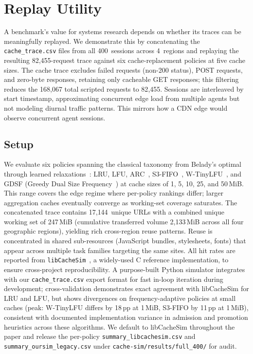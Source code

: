 \documentclass[10pt,sigconf,letterpaper,anonymous,nonacm]{acmart}
\begin{document}
\section{Replay Utility}
\label{sec:replay}

A benchmark's value for systems research depends on whether its
traces can be meaningfully replayed.  We demonstrate this by
concatenating the \texttt{cache\_trace.csv} files from all
400~sessions across 4~regions and replaying the resulting
82{,}455-request trace against six cache-replacement policies at five
cache sizes.  The cache trace excludes failed requests (non-200
status), POST requests, and zero-byte responses, retaining only
cacheable GET responses; this filtering reduces the 168{,}067 total
scripted requests to 82{,}455.  Sessions are interleaved by start
timestamp, approximating concurrent edge load from multiple agents
but not modeling diurnal traffic patterns.  This mirrors how a CDN
edge would observe concurrent agent sessions.

\subsection{Setup}

We evaluate six policies spanning the classical taxonomy from
Belady's optimal~\cite{belady1966} through learned
relaxations~\cite{yang2020learning}: LRU, LFU,
ARC~\cite{megiddo2003}, S3-FIFO~\cite{yang2023s3fifo},
W-TinyLFU~\cite{einziger2017}, and GDSF (Greedy Dual Size Frequency~\cite{cherkasova1998gdsf})
at cache sizes of 1, 5, 10, 25, and 50\,MiB.  This range covers the
edge regime where per-policy rankings differ; larger aggregation
caches eventually converge as working-set coverage saturates.  The
concatenated trace contains 17{,}144~unique URLs with a combined
unique working set of 247\,MiB (cumulative transferred volume
2{,}133\,MiB across all four geographic regions), yielding rich
cross-region reuse patterns.  Reuse is
concentrated in shared sub-resources (JavaScript bundles, stylesheets,
fonts) that appear across multiple task families targeting the same
sites.  All hit rates are reported from \texttt{libCacheSim}~\cite{libcachesim2024},
a widely-used C reference implementation, to ensure cross-project
reproducibility.  A purpose-built Python simulator
integrates with our \texttt{cache\_trace.csv} export format
for fast in-loop iteration during development; cross-validation
demonstrates exact agreement with libCacheSim for LRU and LFU, but shows
divergences on frequency-adaptive policies at small caches
(peak: W-TinyLFU differs by 18\,pp at 1\,MiB, S3-FIFO by 11\,pp at
1\,MiB), consistent with documented implementation variance in
admission and promotion heuristics across these algorithms.  We
default to libCacheSim throughout the paper and release the per-policy
\texttt{summary\_libcachesim.csv} and \texttt{summary\_oursim\_legacy.csv}
under \texttt{cache-sim/results/full\_400/} for audit.
\end{document}
